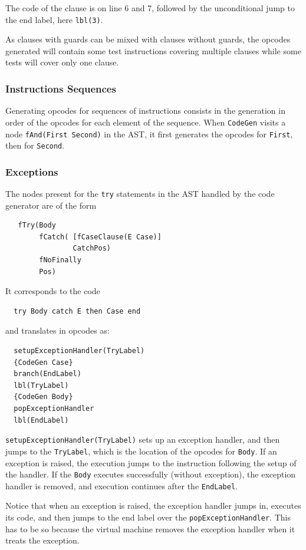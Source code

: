 \documentclass[a4paper]{memoir}
\begin{document}
The code of the clause is on line 6 and 7, followed by the unconditional jump to
the end label, here \lstinline!lbl(3)!.

As clauses with guards can be mixed with clauses without guards, the opcodes
generated will contain some test instructions covering multiple clauses while
some tests will cover only one clause.

\subsubsection{Instructions Sequences}
Generating opcodes for sequences of instructions consists in the generation in order of the opcodes for each element of the sequence. 
When \lstinline!CodeGen! visits a node \lstinline!fAnd(First Second)! in the AST, it first generates the opcodes for \lstinline!First!, then for \lstinline!Second!.


\subsubsection{Exceptions}\label{sec:arch:codegen:exceptions}
The nodes present for the \lstinline!try! statements in the AST handled by the
code generator are of the form
\begin{lstlisting}
   fTry(Body 
        fCatch( [fCaseClause(E Case)] 
                CatchPos) 
        fNoFinally 
        Pos)
\end{lstlisting}
It corresponds to the code
\begin{lstlisting}
  try Body catch E then Case end
\end{lstlisting}
and translates in opcodes as:
\begin{lstlisting}
  setupExceptionHandler(TryLabel)
  {CodeGen Case}
  branch(EndLabel)
  lbl(TryLabel)
  {CodeGen Body}
  popExceptionHandler
  lbl(EndLabel)
\end{lstlisting}

\lstinline!setupExceptionHandler(TryLabel)! sets up an
exception handler, and then jumps to the \lstinline!TryLabel!, which is the
location of the opcodes for \lstinline!Body!. If an exception is raised, the
execution jumps to the instruction following the setup of the handler. If the
\lstinline!Body! executes successfully (without exception), the exception handler
is removed, and execution continues after the \lstinline!EndLabel!.

Notice that when an exception is raised, the exception handler jumps in,
executes its code, and then jumps to the end label over the
\lstinline!popExceptionHandler!. This has to be so because the virtual
machine removes the exception handler when it treats the exception.
\end{document}
